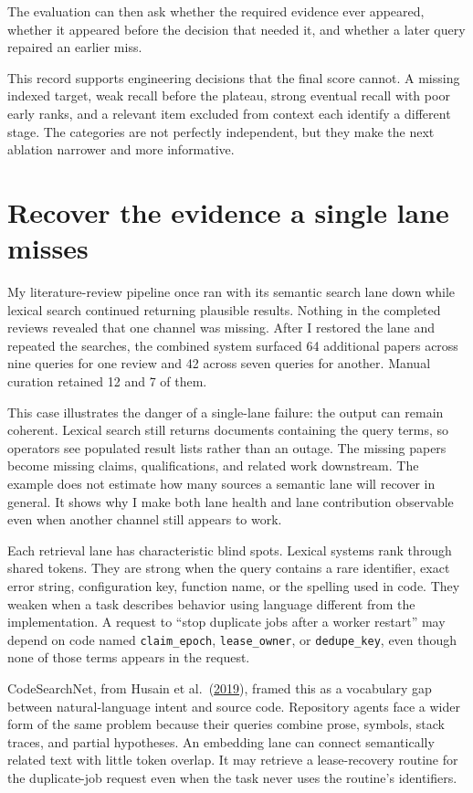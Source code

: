 The evaluation can then ask whether the required evidence ever appeared, whether it appeared before the decision that needed it, and whether a later query repaired an earlier miss.

This record supports engineering decisions that the final score cannot. A missing indexed target, weak recall before the plateau, strong eventual recall with poor early ranks, and a relevant item excluded from context each identify a different stage. The categories are not perfectly independent, but they make the next ablation narrower and more informative.

\section{Recover the evidence a single lane misses}\label{recover-the-evidence-a-single-lane-misses}

My literature-review pipeline once ran with its semantic search lane down while lexical search continued returning plausible results. Nothing in the completed reviews revealed that one channel was missing. After I restored the lane and repeated the searches, the combined system surfaced 64 additional papers across nine queries for one review and 42 across seven queries for another. Manual curation retained 12 and 7 of them.

This case illustrates the danger of a single-lane failure: the output can remain coherent. Lexical search still returns documents containing the query terms, so operators see populated result lists rather than an outage. The missing papers become missing claims, qualifications, and related work downstream. The example does not estimate how many sources a semantic lane will recover in general. It shows why I make both lane health and lane contribution observable even when another channel still appears to work.

Each retrieval lane has characteristic blind spots. Lexical systems rank through shared tokens. They are strong when the query contains a rare identifier, exact error string, configuration key, function name, or the spelling used in code. They weaken when a task describes behavior using language different from the implementation. A request to ``stop duplicate jobs after a worker restart'' may depend on code named \texttt{claim\_epoch}, \texttt{lease\_owner}, or \texttt{dedupe\_key}, even though none of those terms appears in the request.

CodeSearchNet, from Husain et al.~(\href{https://arxiv.org/abs/1909.09436}{2019}), framed this as a vocabulary gap between natural-language intent and source code. Repository agents face a wider form of the same problem because their queries combine prose, symbols, stack traces, and partial hypotheses. An embedding lane can connect semantically related text with little token overlap. It may retrieve a lease-recovery routine for the duplicate-job request even when the task never uses the routine's identifiers.

